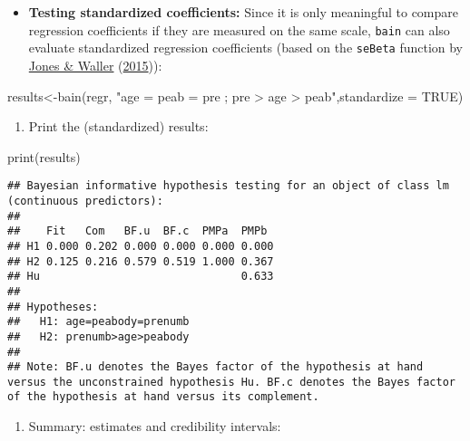 \documentclass[
]{book}
\newenvironment{Shaded}{\begin{snugshade}}{\end{snugshade}}
\newcommand{\AttributeTok}[1]{\textcolor[rgb]{0.77,0.63,0.00}{#1}}
\newcommand{\ConstantTok}[1]{\textcolor[rgb]{0.00,0.00,0.00}{#1}}
\newcommand{\FunctionTok}[1]{\textcolor[rgb]{0.00,0.00,0.00}{#1}}
\newcommand{\NormalTok}[1]{#1}
\newcommand{\OtherTok}[1]{\textcolor[rgb]{0.56,0.35,0.01}{#1}}
\newcommand{\StringTok}[1]{\textcolor[rgb]{0.31,0.60,0.02}{#1}}
\providecommand{\tightlist}{%
  \setlength{\itemsep}{0pt}\setlength{\parskip}{0pt}}
\begin{document}
\begin{itemize}
\tightlist
\item
  \textbf{Testing standardized coefficients:} Since it is only meaningful to compare regression coefficients if they are measured on the same scale, \texttt{bain} can also evaluate standardized regression coefficients (based on the \texttt{seBeta} function by \protect\hyperlink{ref-jones2015normal}{Jones \& Waller} (\protect\hyperlink{ref-jones2015normal}{2015})):
\end{itemize}

\begin{Shaded}
\begin{Highlighting}[]
\NormalTok{results}\OtherTok{\textless{}{-}}\FunctionTok{bain}\NormalTok{(regr, }\StringTok{"age = peab = pre ; pre \textgreater{} age \textgreater{} peab"}\NormalTok{,}\AttributeTok{standardize =} \ConstantTok{TRUE}\NormalTok{)}
\end{Highlighting}
\end{Shaded}

\begin{enumerate}
\def\labelenumi{\arabic{enumi})}
\setcounter{enumi}{3}
\tightlist
\item
  Print the (standardized) results:
\end{enumerate}

\begin{Shaded}
\begin{Highlighting}[]
\FunctionTok{print}\NormalTok{(results)}
\end{Highlighting}
\end{Shaded}

\begin{verbatim}
## Bayesian informative hypothesis testing for an object of class lm (continuous predictors):
## 
##    Fit   Com   BF.u  BF.c  PMPa  PMPb 
## H1 0.000 0.202 0.000 0.000 0.000 0.000
## H2 0.125 0.216 0.579 0.519 1.000 0.367
## Hu                               0.633
## 
## Hypotheses:
##   H1: age=peabody=prenumb
##   H2: prenumb>age>peabody
## 
## Note: BF.u denotes the Bayes factor of the hypothesis at hand versus the unconstrained hypothesis Hu. BF.c denotes the Bayes factor of the hypothesis at hand versus its complement.
\end{verbatim}

\begin{enumerate}
\def\labelenumi{\arabic{enumi})}
\setcounter{enumi}{4}
\tightlist
\item
  Summary: estimates and credibility intervals:
\end{enumerate}
\end{document}
